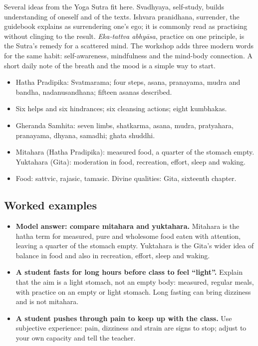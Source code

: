 Several ideas from the Yoga Sutra fit here. Svadhyaya, self-study, builds understanding of oneself and of the texts. Ishvara pranidhana, surrender, the guidebook explains as surrendering one's ego; it is commonly read as practising without clinging to the result. \emph{Eka-tattva abhyāsa}, practice on one principle, is the Sutra's remedy for a scattered mind. The workshop adds three modern words for the same habit: self-awareness, mindfulness and the mind-body connection. A short daily note of the breath and the mood is a simple way to start.

\begin{recall}
\begin{itemize}
\item Hatha Pradipika: Svatmarama; four steps, asana, pranayama, mudra and bandha, nadanusandhana; fifteen asanas described.
\item Six helps and six hindrances; six cleansing actions; eight kumbhakas.
\item Gheranda Samhita: seven limbs, shatkarma, asana, mudra, pratyahara, pranayama, dhyana, samadhi; ghata shuddhi.
\item Mitahara (Hatha Pradipika): measured food, a quarter of the stomach empty. Yuktahara (Gita): moderation in food, recreation, effort, sleep and waking.
\item Food: sattvic, rajasic, tamasic. Divine qualities: Gita, sixteenth chapter.
\end{itemize}
\end{recall}

\subsection*{Worked examples}
\begin{itemize}
\item \textbf{Model answer: compare mitahara and yuktahara.} Mitahara is the hatha term for measured, pure and wholesome food eaten with attention, leaving a quarter of the stomach empty. Yuktahara is the Gita's wider idea of balance in food and also in recreation, effort, sleep and waking.
\item \textbf{A student fasts for long hours before class to feel ``light''.} Explain that the aim is a light stomach, not an empty body: measured, regular meals, with practice on an empty or light stomach. Long fasting can bring dizziness and is not mitahara.
\item \textbf{A student pushes through pain to keep up with the class.} Use subjective experience: pain, dizziness and strain are signs to stop; adjust to your own capacity and tell the teacher.
\end{itemize}

